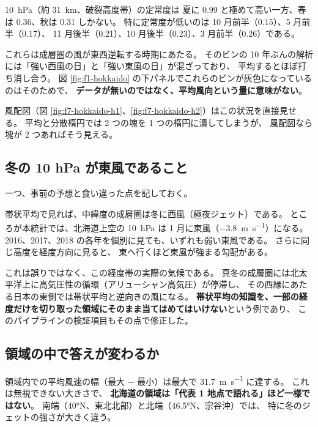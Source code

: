 

\SI{10}{\hecto\pascal}（約 \SI{31}{\kilo\metre}、破裂高度帯）の定常度は
夏に 0.99 と極めて高い一方、春は 0.36、秋は 0.31 しかない。
特に定常度が低いのは 10 月前半（0.15）、5 月前半（0.17）、
11 月後半（0.21）、10 月後半（0.23）、3 月前半（0.26）である。

これらは成層圏の風が東西逆転する時期にあたる。
そのビンの 10 年ぶんの解析には「強い西風の日」と「強い東風の日」が混ざっており、
平均するとほぼ打ち消し合う。
図 \ref{fig:f1-hokkaido} の下パネルでこれらのビンが灰色になっているのはそのためで、
\textbf{データが無いのではなく、平均風向という量に意味がない}。



風配図（図 \ref{fig:f7-hokkaido-h1}、\ref{fig:f7-hokkaido-h2}）はこの状況を直接見せる。
平均と分散楕円では 2 つの塊を 1 つの楕円に潰してしまうが、
風配図なら塊が 2 つあればそう見える。

\subsection{冬の 10 hPa が東風であること}

一つ、事前の予想と食い違った点を記しておく。

帯状平均で見れば、中緯度の成層圏は冬に西風（極夜ジェット）である。
ところが本統計では、北海道上空の \SI{10}{\hecto\pascal} は
1 月に東風（\SI{-3.8}{\metre\per\second}）になる。
2016、2017、2018 の各年を個別に見ても、いずれも弱い東風である。
さらに同じ高度を経度方向に見ると、
東へ行くほど東風が強まる勾配がある。

これは誤りではなく、この経度帯の実際の気候である。
真冬の成層圏には北太平洋上に高気圧性の循環（アリューシャン高気圧）が停滞し、
その西縁にあたる日本の東側では帯状平均と逆向きの風になる。
\textbf{帯状平均の知識を、一部の経度だけを切り取った領域にそのまま当てはめてはいけない}という例であり、
このパイプラインの検証項目もその点で修正した。

\subsection{領域の中で答えが変わるか}



領域内での平均風速の幅（最大 $-$ 最小）は最大で \SI{31.7}{\metre\per\second} に達する。
これは無視できない大きさで、
\textbf{北海道の領域は「代表 1 地点で語れる」ほど一様ではない}。
南端（\ang{40}N、東北北部）と北端（\ang{46.5}N、宗谷沖）では、
特に冬のジェットの強さが大きく違う。

